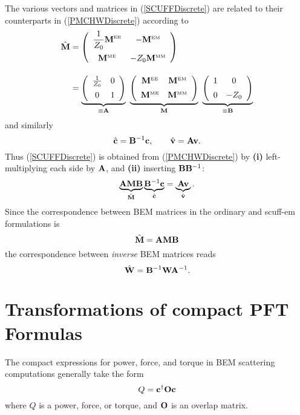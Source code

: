 \documentclass[letterpaper]{article}
\begin{document}
\noindent The various vectors and matrices in (\ref{SCUFFDiscrete}) are 
related to their counterparts in (\ref{PMCHWDiscrete}) according to
\begin{align*}
\hat{\vb M}
&=
    \left(\begin{array}{cc} 
      \displaystyle{\frac{1}{Z_0} \vb M\supt{EE}} &  -\vb M\supt{EM} \\[10pt]
                                   \vb M\supt{ME} & -Z_0 \vb M\supt{MM}
    \end{array}\right)
\\[10pt]
&= \underbrace{
    \left(\begin{array}{cc} 
                    \frac{1}{Z_0} & 0 \\[5pt] 
                                 0 & 1 
    \end{array}\right)
              }_{\equiv \vb A} 
%  
    \,\,
%  
    \underbrace{
    \left(\begin{array}{cc} 
      \vb M\supt{EE} &  \vb M\supt{EM} \\[5pt]
      \vb M\supt{ME} &  \vb M\supt{MM}
    \end{array}\right)
               }_{\vb M}
%  
    \,\,
%  
    \underbrace{
    \left(\begin{array}{cc} 
      1 & 0 \\[5pt] 
      0 & -Z_0
    \end{array}\right)
               }_{\equiv \vb B}
\end{align*}
and similarly 
$$ \hat{\mathbf{c}}=\mathbf{B}^{-1} \mathbf{c}, \qquad 
   \hat{\mathbf{v}}=\mathbf{A}      \mathbf{v}.
$$
Thus (\ref{SCUFFDiscrete}) is obtained from 
(\ref{PMCHWDiscrete}) by \textbf{(i)} left-multiplying
each side by $\mathbf{A}$, and \textbf{(ii)} inserting
$\mathbf{B} \mathbf{B}^{-1}$:
$$ \underbrace{\mathbf{A} \mathbf{M} \mathbf{B}}_{\hat{\mathbf{M}}}
   \underbrace{\mathbf{B}^{-1} \mathbf{c}}_{\hat{\mathbf{c}}}
   =
   \underbrace{\mathbf{A}      \mathbf{v}}_{\hat{\mathbf{v}}}.
$$
Since the correspondence between BEM matrices in the ordinary and 
{\sc scuff-em} formulations is 
$$ \hat{\mathbf{M}} = \mathbf{A} \mathbf{M} \mathbf{B} $$
the correspondence between \textit{inverse} BEM matrices reads
$$ \hat{\mathbf{W}} = \mathbf{B}^{-1} \mathbf{W} \mathbf{A}^{-1}. $$

\section{Transformations of compact PFT Formulas}

The compact expressions for power, force, and torque in 
BEM scattering computations generally take the form
%
$$ Q = \mathbf{c}^\dagger \mathbf{O} \mathbf{c} $$ 
%
where $Q$ is a power, force, or torque, and $\mathbf{O}$ is an
overlap matrix.
\end{document}
